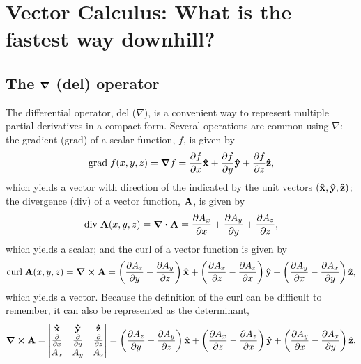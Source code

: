 \chapter{Vector Calculus: What is the fastest way downhill?} \label{apx:vcalc}

\section{The $\grad$ (del) operator}

The differential operator, del ($\nabla$), is a convenient way to represent
multiple partial derivatives in a compact form.  Several operations are common
using $\nabla$: the gradient ($\mbox{grad}$) of a scalar function, $f$, is given
by
\begin{equation}
    \mbox{grad}\; f(x,y,z) = \grad f = \pdv{f}{x}\vu{x} + \pdv{f}{y}\vu{y} +
        \pdv{f}{z}\vu{z},
\end{equation}
which yields a vector with direction of the indicated by the unit vectors
$(\vu{x}, \vu{y}, \vu{z})$; the divergence ($\mbox{div}$) of a vector
function, $\vb{A}$, is given by
\begin{equation}
    \mbox{div}\; \vb{A}(x,y,z) = \div \vb{A} =
        \pdv{A_x}{x} + \pdv{A_y}{y} + \pdv{A_z}{z},
\end{equation}
which yields a scalar; and the curl of a vector function is given by
\begin{equation}
    \mbox{curl}\; \vb{A}(x,y,z) = \curl \vb{A} = 
        \left( \pdv{A_z}{y} - \pdv{A_y}{z} \right) \vu{x} +
        \left( \pdv{A_x}{z} - \pdv{A_z}{x} \right) \vu{y} +
        \left( \pdv{A_y}{x} - \pdv{A_x}{y} \right) \vu{z},
\end{equation}
which yields a vector.  Because the definition of the curl can be difficult to
remember, it can also be represented as the determinant,
\begin{equation*}
    \curl \vb{A} =
    \begin{vmatrix}
        \vu{x} & \vu{y} & \vu{z} \\
        \pdv{}{x} & \pdv{}{y} & \pdv{}{z} \\
        A_{x} & A_{y} & A_{z}
    \end{vmatrix}
    = \left( \pdv{A_z}{y} - \pdv{A_y}{z} \right) \vu{x} +
    \left( \pdv{A_x}{z} - \pdv{A_z}{x} \right) \vu{y} +
    \left( \pdv{A_y}{x} - \pdv{A_x}{y} \right) \vu{z},
\end{equation*}

